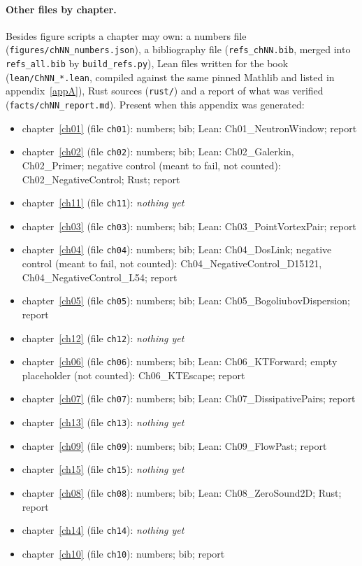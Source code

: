 \paragraph{Other files by chapter.} Besides figure scripts a chapter may own: a numbers file (\texttt{figures/\allowbreak{}chNN\_\allowbreak{}numbers.\allowbreak{}json}), a bibliography file (\texttt{refs\_\allowbreak{}chNN.\allowbreak{}bib}, merged into \texttt{refs\_all.bib} by \texttt{build\_\allowbreak{}refs.\allowbreak{}py}), Lean files written for the book (\texttt{lean/\allowbreak{}ChNN\_\allowbreak{}*.\allowbreak{}lean}, compiled against the same pinned Mathlib and listed in appendix~\ref{appA}), Rust sources (\texttt{rust/}) and a report of what was verified (\texttt{facts/\allowbreak{}chNN\_\allowbreak{}report.\allowbreak{}md}). Present when this appendix was generated:
\begin{itemize}[nosep]
\item chapter~\ref{ch01} (file \texttt{ch01}): numbers; bib; Lean: Ch01\_\allowbreak{}NeutronWindow; report
\item chapter~\ref{ch02} (file \texttt{ch02}): numbers; bib; Lean: Ch02\_\allowbreak{}Galerkin,\allowbreak{} Ch02\_\allowbreak{}Primer; negative control (meant to fail,\allowbreak{} not counted): Ch02\_\allowbreak{}NegativeControl; Rust; report
\item chapter~\ref{ch11} (file \texttt{ch11}): \emph{nothing yet}
\item chapter~\ref{ch03} (file \texttt{ch03}): numbers; bib; Lean: Ch03\_\allowbreak{}PointVortexPair; report
\item chapter~\ref{ch04} (file \texttt{ch04}): numbers; bib; Lean: Ch04\_\allowbreak{}DosLink; negative control (meant to fail,\allowbreak{} not counted): Ch04\_\allowbreak{}NegativeControl\_\allowbreak{}D15121,\allowbreak{} Ch04\_\allowbreak{}NegativeControl\_\allowbreak{}L54; report
\item chapter~\ref{ch05} (file \texttt{ch05}): numbers; bib; Lean: Ch05\_\allowbreak{}BogoliubovDispersion; report
\item chapter~\ref{ch12} (file \texttt{ch12}): \emph{nothing yet}
\item chapter~\ref{ch06} (file \texttt{ch06}): numbers; bib; Lean: Ch06\_\allowbreak{}KTForward; empty placeholder (not counted): Ch06\_\allowbreak{}KTEscape; report
\item chapter~\ref{ch07} (file \texttt{ch07}): numbers; bib; Lean: Ch07\_\allowbreak{}DissipativePairs; report
\item chapter~\ref{ch13} (file \texttt{ch13}): \emph{nothing yet}
\item chapter~\ref{ch09} (file \texttt{ch09}): numbers; bib; Lean: Ch09\_\allowbreak{}FlowPast; report
\item chapter~\ref{ch15} (file \texttt{ch15}): \emph{nothing yet}
\item chapter~\ref{ch08} (file \texttt{ch08}): numbers; bib; Lean: Ch08\_\allowbreak{}ZeroSound2D; Rust; report
\item chapter~\ref{ch14} (file \texttt{ch14}): \emph{nothing yet}
\item chapter~\ref{ch10} (file \texttt{ch10}): numbers; bib; report
\end{itemize}
